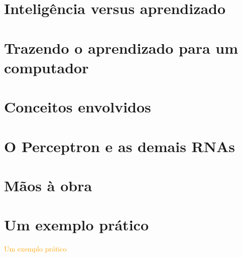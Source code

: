 \documentclass[aspectratio=169]{beamer} %
\begin{document}
\section{Inteligência versus aprendizado}

\section{Trazendo o aprendizado para um computador}

\section{Conceitos envolvidos}

\section{O Perceptron e as demais RNAs}

\section{Mãos à obra}

\section{Um exemplo prático}
{
\begin{frame}
\vspace{2cm}
\begin{center}
\huge
	\textcolor{orange}{Um exemplo prático}
\end{center}

\end{frame} 
}
\end{document}
